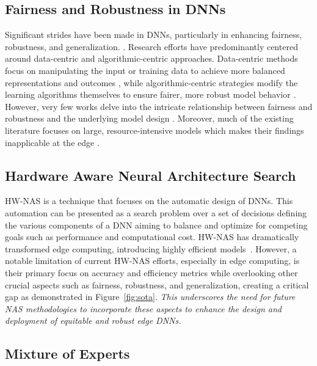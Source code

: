 \subsection{Fairness and Robustness in DNNs}
Significant strides have been made in DNNs, particularly in enhancing fairness, robustness, and generalization. \cite{narayanan2024fairness, ali2024assessing, zhang2021understanding}. Research efforts have predominantly centered around data-centric and algorithmic-centric approaches. Data-centric methods focus on manipulating the input or training data to achieve more balanced representations and outcomes \cite{wu2022fair, celis2020data}, while algorithmic-centric strategies modify the learning algorithms themselves to ensure fairer, more robust model behavior \cite{li2021ditto}. However, very few works delve into the intricate relationship between fairness and robustness and the underlying model design \cite{sheng2022larger}. Moreover, much of the existing literature focuses on large, resource-intensive models which makes their findings inapplicable at the edge \cite{parraga2023fairness, gustafson2023facet}.

\subsection{Hardware Aware Neural Architecture Search}
HW-NAS is a technique that focuses on the automatic design of DNNs. This automation can be presented as a search problem over a set of decisions defining the various components of a DNN aiming to balance and optimize for competing goals such as performance and computational cost\cite{benmeziane2021comprehensive}. HW-NAS has dramatically transformed edge computing, introducing highly efficient models~\cite{terven2023comprehensive,koonce2021mobilenetv3,mehta2021mobilevit}. However, a notable limitation of current HW-NAS efforts, especially in edge computing, is their primary focus on accuracy and efficiency metrics while overlooking other crucial aspects such as fairness, robustness, and generalization, creating a critical gap as demonstrated in Figure~\ref{fig:sota}. \textit{This underscores the need for future NAS methodologies to incorporate these aspects to enhance the design and deployment of equitable and robust edge DNNs.}

\subsection{Mixture of Experts}


